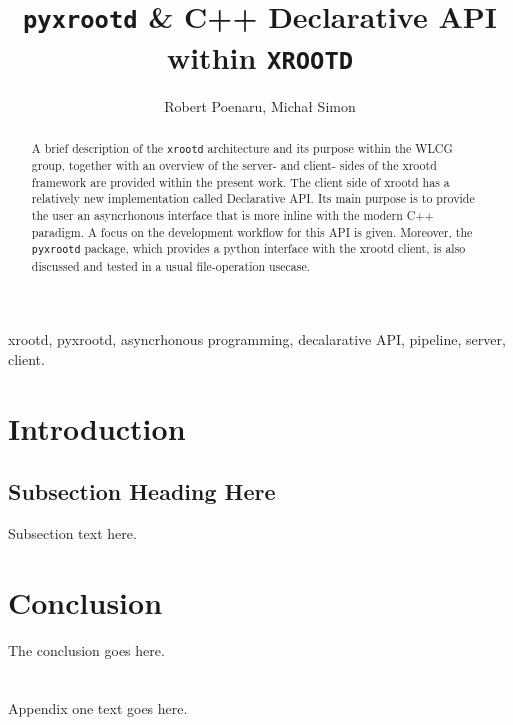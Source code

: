 \documentclass[journal]{IEEEtran}
\begin{document}
\title{\texttt{pyxrootd} \& C++ Declarative API \\within \texttt{XROOTD}}
\author{Robert Poenaru, Michał Simon}

\maketitle

\begin{abstract}
A brief description of the \texttt{xrootd} architecture and its purpose within the WLCG group, together with an overview of the server- and client- sides of the xrootd framework are provided within the present work. The client side of xrootd has a relatively new implementation called Declarative API. Its main purpose is to provide the user an asyncrhonous interface that is more inline with the modern C++ paradigm. A focus on the development workflow for this API is given. Moreover, the \texttt{pyxrootd} package, which provides a python interface with the xrootd client, is also discussed and tested in a usual file-operation usecase.
\end{abstract}

\begin{IEEEkeywords}
xrootd, pyxrootd, asyncrhonous programming, decalarative API, pipeline, server, client.
\end{IEEEkeywords}

\IEEEpeerreviewmaketitle

\section{Introduction}
\lipsum[1]

\subsection{Subsection Heading Here}
Subsection text here.
\lipsum[1-2]

\section{Conclusion}
The conclusion goes here.

\appendices
\section{}
Appendix one text goes here.
\end{document}
